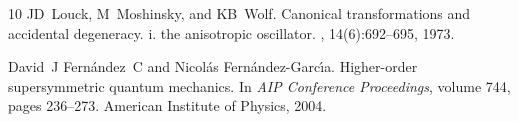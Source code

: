 \documentclass[12pt]{article}
\numberwithin{equation}{section} %
\begin{document}
\begin{thebibliography}{10}
JD~Louck, M~Moshinsky, and KB~Wolf.
\newblock Canonical transformations and accidental degeneracy. i. the
  anisotropic oscillator.
, 14(6):692--695, 1973.

David~J Fern{\'a}ndez~C and Nicol{\'a}s Fern{\'a}ndez-Garc{\'\i}a.
\newblock Higher-order supersymmetric quantum mechanics.
\newblock In {\em AIP Conference Proceedings}, volume 744, pages 236--273.
  American Institute of Physics, 2004.

\end{thebibliography}
\end{document}
